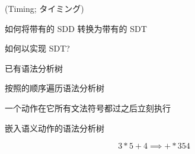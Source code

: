 \begin{frame}{}
  \begin{center}
     (Timing; タイミング)


    \vspace{0.30cm}
  \end{center}
\end{frame}

\begin{frame}{}
  \begin{center}
     如何将带有的 SDD 转换为带有的 SDT

    \vspace{0.60cm}
    

    \vspace{0.60cm}
     如何以实现 SDT?
  \end{center}
\end{frame}

\begin{frame}{}
  \begin{center}
     已有语法分析树

    \vspace{0.50cm}

    \vspace{0.50cm}
    按照的顺序遍历语法分析树

    \pause
    \vspace{0.50cm}
     一个动作在它所有文法符号都过之后立刻执行
  \end{center}
\end{frame}

\begin{frame}{}
  \begin{center}
  \end{center}
\end{frame}

\begin{frame}{}
  \begin{center}
    嵌入语义动作的语法分析树

    \[
      3 \ast 5 + 4 \implies + \ast 3 5 4
    \]
  \end{center}
\end{frame}

